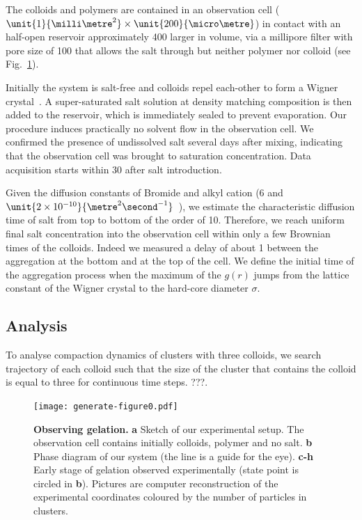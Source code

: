 The colloids and polymers are contained in an observation cell ($\unit{1}{\milli\metre^2} \times \unit{200}{\micro\metre}$) in contact with an half-open reservoir approximately 400 larger in volume, via a millipore filter with pore size of \unit{100}{\nano\metre} that allows the salt through but neither polymer nor colloid (see Fig.~\ref{fig:methods}).

Initially the system is salt-free and colloids repel each-other to form a Wigner crystal~\cite{Royall2003}. A super-saturated salt solution at density matching composition is then added to the reservoir, which is immediately sealed to prevent evaporation. Our procedure induces practically no solvent flow in the observation cell. We confirmed the presence of undissolved salt several days after mixing, indicating that the observation cell was brought to saturation concentration. Data acquisition starts within \unit{30}{\second} after salt introduction.

Given the diffusion constants of Bromide and alkyl cation ($6$ and $\unit{2 \times 10^{-10}}{\metre^2\second^{-1}}$~\cite{Campbell2005}), we estimate the characteristic diffusion time of salt from top to bottom of the order of \unit{10}{\second}. Therefore, we reach uniform final salt concentration into the observation cell within only a few Brownian times of the colloids. Indeed we measured a delay of about \unit{1}{\min} between the aggregation at the bottom and at the top of the cell. We define the initial time of the aggregation process when the maximum of the $g(r)$ jumps from the lattice constant of the Wigner crystal to the hard-core diameter $\sigma$.


\subsection*{Analysis}

To analyse compaction dynamics of clusters with three colloids, we search trajectory of each colloid such that the size of the cluster that contains the colloid is equal to three for continuous time steps.
???.




\clearpage
\begin{figure}
	\begin{center}
	\texttt{[image: generate-figure0.pdf]}
	\end{center}
	\caption{\textbf{Observing gelation.} \textbf{a} Sketch of our experimental setup. The observation cell contains initially colloids, polymer and no salt. \textbf{b} Phase diagram of our system (the line is a guide for the eye). \textbf{c-h} Early stage of gelation observed experimentally (state point is circled in \textbf{b}). Pictures are computer reconstruction of the experimental coordinates coloured by the number of particles in clusters.}
	\label{fig:methods}
\end{figure}

